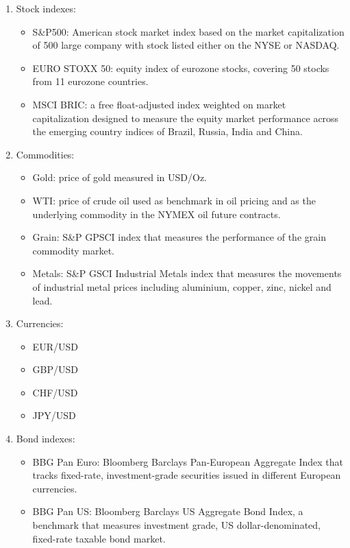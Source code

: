 \documentclass[12pt]{elsarticle}
\begin{document}
\begin{enumerate}
\item Stock indexes:
	\begin{itemize}
		\item S\&P500: American stock market index based on the market capitalization of 500 large company with stock listed either on the NYSE or NASDAQ.
		\item EURO STOXX 50: equity index of eurozone stocks, covering 50 stocks from 11 eurozone countries.
		\item MSCI BRIC: a free float-adjusted index weighted on market capitalization designed to measure the equity market performance across the emerging country indices of Brazil, Russia, India and China.
	\end{itemize}
\item Commodities:
	\begin{itemize}
		\item Gold: price of gold measured in USD/Oz.
		\item WTI: price of crude oil used as benchmark in oil pricing and as the underlying commodity in the NYMEX oil future contracts.
		\item Grain: S\&P GPSCI index that measures the performance of the grain commodity market.
		\item Metals: S\&P GSCI Industrial Metals index that measures the movements of industrial metal prices including aluminium, copper, zinc, nickel and lead.
	\end{itemize}
\item Currencies:
	\begin{itemize}
	\item EUR/USD
	\item GBP/USD
	\item CHF/USD
	\item JPY/USD
	\end{itemize}
\item Bond indexes:
	\begin{itemize}
		\item BBG Pan Euro: Bloomberg Barclays Pan-European Aggregate Index that tracks fixed-rate, investment-grade securities issued in different European currencies.
		\item BBG Pan US: Bloomberg Barclays US Aggregate Bond Index, a benchmark that measures investment grade, US dollar-denominated, fixed-rate taxable bond market.
	\end{itemize}
\end{enumerate}
\end{document}
